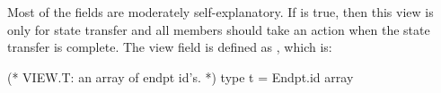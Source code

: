 Most of the fields are moderately self-explanatory.  If
 is true, then this view is only for state transfer
and all members should take an  action when the state
transfer is complete.  The view field is defined as ,
which is:
\begin{codebox}
(* VIEW.T: an array of endpt id's.
 *)
type t = Endpt.id array
\end{codebox}
